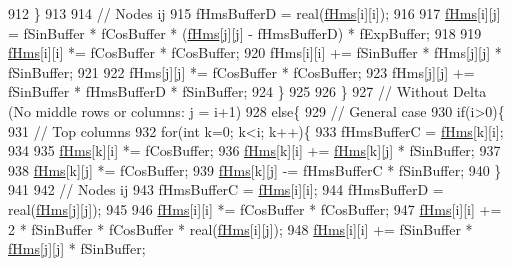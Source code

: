 \begin{DoxyCode}
912       \}
913 
914       \textcolor{comment}{// Nodes ij}
915       fHmsBufferD = real(\hyperlink{classOscProb_1_1PMNS__Base_acd3c8783e7603081eab316ea4c86c766}{fHms}[i][i]);
916 
917       \hyperlink{classOscProb_1_1PMNS__Base_acd3c8783e7603081eab316ea4c86c766}{fHms}[i][j] = fSinBuffer * fCosBuffer * (\hyperlink{classOscProb_1_1PMNS__Base_acd3c8783e7603081eab316ea4c86c766}{fHms}[j][j] - fHmsBufferD) * fExpBuffer;
918 
919       \hyperlink{classOscProb_1_1PMNS__Base_acd3c8783e7603081eab316ea4c86c766}{fHms}[i][i] *= fCosBuffer * fCosBuffer;
920       fHms[i][i] += fSinBuffer * fHms[j][j] * fSinBuffer;
921 
922       fHms[j][j] *= fCosBuffer * fCosBuffer;
923       fHms[j][j] += fSinBuffer * fHmsBufferD * fSinBuffer;
924     \}
925 
926   \}
927   \textcolor{comment}{// Without Delta (No middle rows or columns: j = i+1)}
928   \textcolor{keywordflow}{else}\{
929     \textcolor{comment}{// General case}
930     \textcolor{keywordflow}{if}(i>0)\{
931       \textcolor{comment}{// Top columns}
932       \textcolor{keywordflow}{for}(\textcolor{keywordtype}{int} k=0; k<i; k++)\{
933         fHmsBufferC = \hyperlink{classOscProb_1_1PMNS__Base_acd3c8783e7603081eab316ea4c86c766}{fHms}[k][i];
934 
935         \hyperlink{classOscProb_1_1PMNS__Base_acd3c8783e7603081eab316ea4c86c766}{fHms}[k][i] *= fCosBuffer;
936         \hyperlink{classOscProb_1_1PMNS__Base_acd3c8783e7603081eab316ea4c86c766}{fHms}[k][i] += \hyperlink{classOscProb_1_1PMNS__Base_acd3c8783e7603081eab316ea4c86c766}{fHms}[k][j] * fSinBuffer;
937 
938         \hyperlink{classOscProb_1_1PMNS__Base_acd3c8783e7603081eab316ea4c86c766}{fHms}[k][j] *= fCosBuffer;
939         \hyperlink{classOscProb_1_1PMNS__Base_acd3c8783e7603081eab316ea4c86c766}{fHms}[k][j] -= fHmsBufferC * fSinBuffer;
940       \}
941 
942       \textcolor{comment}{// Nodes ij}
943       fHmsBufferC = \hyperlink{classOscProb_1_1PMNS__Base_acd3c8783e7603081eab316ea4c86c766}{fHms}[i][i];
944       fHmsBufferD = real(\hyperlink{classOscProb_1_1PMNS__Base_acd3c8783e7603081eab316ea4c86c766}{fHms}[j][j]);
945 
946       \hyperlink{classOscProb_1_1PMNS__Base_acd3c8783e7603081eab316ea4c86c766}{fHms}[i][i] *= fCosBuffer * fCosBuffer;
947       \hyperlink{classOscProb_1_1PMNS__Base_acd3c8783e7603081eab316ea4c86c766}{fHms}[i][i] += 2 * fSinBuffer * fCosBuffer * real(\hyperlink{classOscProb_1_1PMNS__Base_acd3c8783e7603081eab316ea4c86c766}{fHms}[i][j]);
948       \hyperlink{classOscProb_1_1PMNS__Base_acd3c8783e7603081eab316ea4c86c766}{fHms}[i][i] += fSinBuffer * \hyperlink{classOscProb_1_1PMNS__Base_acd3c8783e7603081eab316ea4c86c766}{fHms}[j][j] * fSinBuffer;

\end{DoxyCode}
